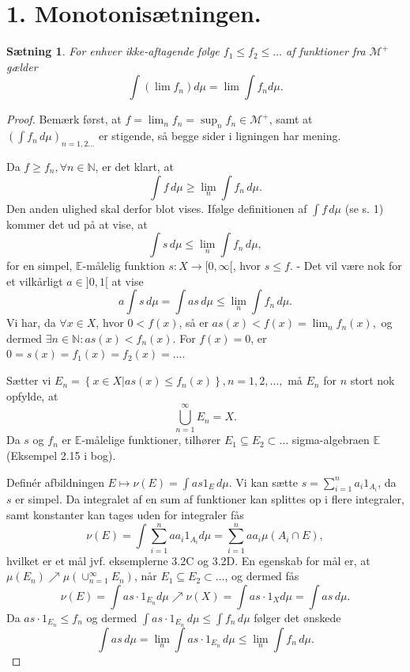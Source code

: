 \documentclass[12pt]{report}
\newtheorem{theorem}[lemma]{Sætning}
\theoremstyle{break}
\newtheorem*{proof}{Bevis}
\theoremstyle{break}
\newcommand{\EE}{\mathbb{E}}
\newcommand{\M}{\mathcal{M}^+}
\begin{document}
\section*{1. Monotonisætningen.}
\begin{theorem}
For enhver ikke-aftagende følge $f_1\leq f_2\leq\ldots$ af funktioner fra $\M$ gælder
\[\int(\lim f_n)d\mu = \lim\int f_n d\mu.\]
\end{theorem}
\begin{proof}
Bemærk først, at $f=\lim_nf_n =\sup_nf_n\in\M$, samt at $(\int f_n\, d\mu)_ {n=1,2\ldots}$ er stigende, så begge sider i ligningen har mening.

\bigskip

Da $f\geq f_n, \forall n\in\mathbb{N}$, er det klart, at 
\[\int f\, d\mu\geq\lim\limits_{n}\int f_n\, d\mu.\]
Den anden ulighed skal derfor blot vises. Ifølge definitionen af $\int f\, d\mu$ (se s. 1) kommer det ud på at vise, at 
\[\int s\, d\mu\leq\lim\limits_{n}\int f_n\, d\mu,\]
for en simpel, $\EE$-målelig funktion $s\colon X\to [0,\infty[$, hvor $s\leq f$. - Det vil være nok for et vilkårligt $a\in]0,1[$ at vise
\[a\int s\, d\mu = \int as\, d\mu\leq\lim\limits_{n}\int f_n\, d\mu.\]
Vi har, da $\forall x\in X$, hvor $0<f(x)$, så er $as(x)<f(x)=\lim_nf_n(x),$ og dermed $\exists n\in\mathbb{N}\colon as(x)<f_n(x)$. For $f(x)=0$, er $0=s(x)=f_1(x)=f_2(x)=\ldots$.

\bigskip

Sætter vi $E_n = \left\{ x \in X|as(x) \leqslant f_n(x) \right\},n = 1,2, \ldots,$ må $E_n$ for $n$ stort nok opfylde, at
\[\bigcup\limits_{n = 1}^\infty  {{E_n}}  = X.\]
Da $s$ og $f_n$ er $\EE$-målelige funktioner, tilhører $E_1\subseteq E_2\subset\ldots$ sigma-algebraen $\EE$ (Eksempel 2.15 i bog).

\bigskip

Definér afbildningen $E\mapsto\nu(E)=\int as1_E\, d\mu$. Vi kan sætte $s = \sum\nolimits_{i = 1}^n {{a_i}{1_{{A_i}}}}$, da $s$ er simpel. Da integralet af en sum af funktioner kan splittes op i flere integraler, samt konstanter kan tages uden for integraler fås
\[\nu (E) = \int {\sum\limits_{i = 1}^n {a{a_i}{1_{{A_i}}}} } d\mu  = \sum\limits_{i = 1}^n {a{a_i}\mu ({A_i} \cap E)}, \]
hvilket er et mål jvf. eksemplerne 3.2C og 3.2D. En egenskab for mål er, at $\mu(E_n)\nearrow\mu\left(\cup^{\infty}_{n=1}E_n\right)$, når $E_1\subseteq E_2\subset\ldots$, og dermed fås
\[\nu (E) = \int {as\cdot{1_{{E_n}}}} d\mu  \nearrow \nu (X) = \int {as\cdot{1_X}} d\mu  = \int {as} \,d\mu. \]
Da $as\cdot 1_{E_n}\leq f_n$ og dermed $\int as\cdot 1_{E_n}\, d\mu\leq\int f_n\, d\mu$ følger det ønskede
\[\int as\, d\mu = \lim\limits_{n}\int as\cdot 1_{E_n}\, d\mu\leq\lim\limits_{n}\int f_n\, d\mu.\]
\end{proof}
\newpage
\end{document}
